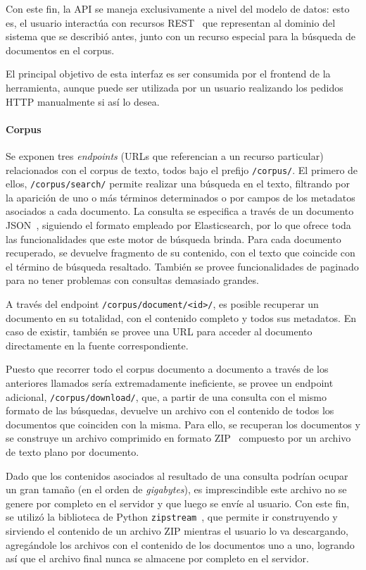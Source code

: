 Con este fin, la API se maneja exclusivamente a nivel del modelo de datos: esto es, el usuario
interactúa con recursos REST~\cite{Fielding2000} que representan al dominio del sistema que se
describió antes, junto con un recurso especial para la búsqueda de documentos en el corpus.

El principal objetivo de esta interfaz es ser consumida por el frontend de la herramienta, aunque
puede ser utilizada por un usuario realizando los pedidos HTTP manualmente si así lo desea.


\paragraph{Corpus}

Se exponen tres \textit{endpoints} (URLs que referencian a un recurso particular) relacionados con
el corpus de texto, todos bajo el prefijo \texttt{/corpus/}. El primero de ellos,
\texttt{/corpus/search/} permite realizar una búsqueda en el texto, filtrando por la aparición de
uno o más términos determinados o por campos de los metadatos asociados a cada documento. La
consulta se especifica a través de un documento JSON~\cite{JSON}, siguiendo el formato empleado por
Elasticsearch, por lo que ofrece toda las funcionalidades que este motor de búsqueda brinda. Para
cada documento recuperado, se devuelve fragmento de su contenido, con el texto que coincide con el
término de búsqueda resaltado. También se provee funcionalidades de paginado para no tener problemas
con consultas demasiado grandes.

A través del endpoint \texttt{/corpus/document/<id>/}, es posible recuperar un documento en su
totalidad, con el contenido completo y todos sus metadatos. En caso de existir, también se provee
una URL para acceder al documento directamente en la fuente correspondiente.

Puesto que recorrer todo el corpus documento a documento a través de los anteriores llamados sería
extremadamente ineficiente, se provee un endpoint adicional, \texttt{/corpus/download/}, que, a
partir de una consulta con el mismo formato de las búsquedas, devuelve un archivo con el contenido
de todos los documentos que coinciden con la misma. Para ello, se recuperan los documentos y se
construye un archivo comprimido en formato ZIP~\cite{ZIPFormat} compuesto por un archivo de texto
plano por documento.

Dado que los contenidos asociados al resultado de una consulta podrían ocupar un gran tamaño (en el
orden de \textit{gigabytes}), es imprescindible este archivo no se genere por completo en el
servidor y que luego se envíe al usuario. Con este fin, se utilizó la biblioteca de Python
\texttt{zipstream}~\cite{zipstream}, que permite ir construyendo y sirviendo el contenido de un archivo
ZIP mientras el usuario lo va descargando, agregándole los archivos con el contenido de los documentos
uno a uno, logrando así que el archivo final nunca se almacene por completo en el servidor.

